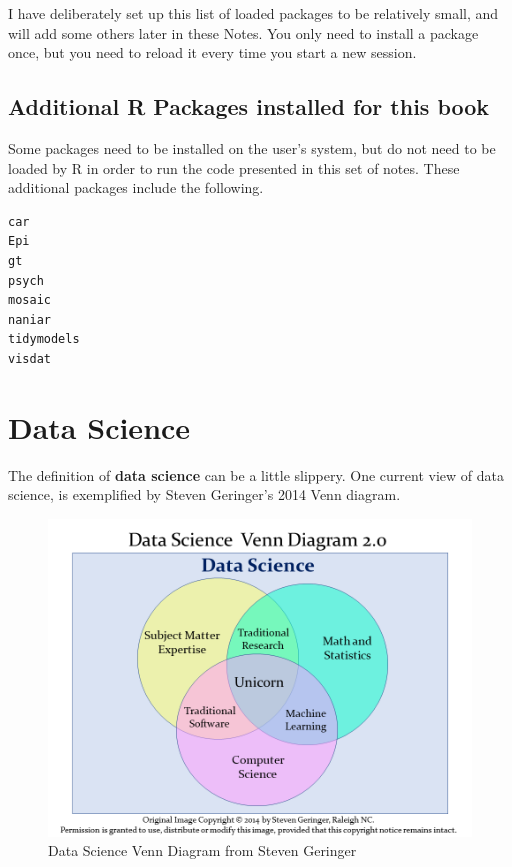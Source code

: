 \documentclass[
]{book}
\begin{document}
I have deliberately set up this list of loaded packages to be relatively small, and will add some others later in these Notes. You only need to install a package once, but you need to reload it every time you start a new session.

\hypertarget{additional-r-packages-installed-for-this-book}{%
\section*{Additional R Packages installed for this book}\label{additional-r-packages-installed-for-this-book}}

Some packages need to be installed on the user's system, but do not need to be loaded by R in order to run the code presented in this set of notes. These additional packages include the following.

\begin{verbatim}
car
Epi
gt
psych
mosaic
naniar
tidymodels
visdat
\end{verbatim}

\hypertarget{data-science}{%
\chapter{Data Science}\label{data-science}}

The definition of \textbf{data science} can be a little slippery. One current view of data science, is exemplified by Steven Geringer's 2014 Venn diagram.

\begin{figure}
\includegraphics[width=0.8\linewidth]{figures/data-science-venn20} \caption{Data Science Venn Diagram from Steven Geringer}\label{fig:datasci-fig}
\end{figure}
\end{document}

